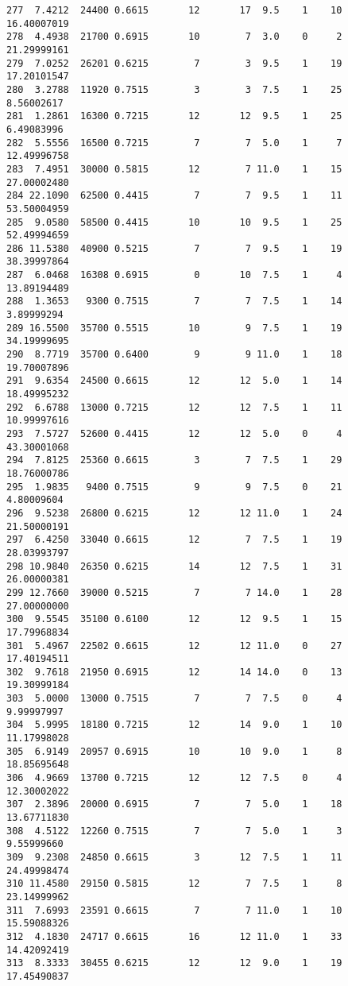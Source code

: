 \documentclass[
  letterpaper,
  DIV=11,
  numbers=noendperiod]{scrreprt}
\begin{document}
\begin{verbatim}
277  7.4212  24400 0.6615       12       17  9.5    1    10 16.40007019
278  4.4938  21700 0.6915       10        7  3.0    0     2 21.29999161
279  7.0252  26201 0.6215        7        3  9.5    1    19 17.20101547
280  3.2788  11920 0.7515        3        3  7.5    1    25  8.56002617
281  1.2861  16300 0.7215       12       12  9.5    1    25  6.49083996
282  5.5556  16500 0.7215        7        7  5.0    1     7 12.49996758
283  7.4951  30000 0.5815       12        7 11.0    1    15 27.00002480
284 22.1090  62500 0.4415        7        7  9.5    1    11 53.50004959
285  9.0580  58500 0.4415       10       10  9.5    1    25 52.49994659
286 11.5380  40900 0.5215        7        7  9.5    1    19 38.39997864
287  6.0468  16308 0.6915        0       10  7.5    1     4 13.89194489
288  1.3653   9300 0.7515        7        7  7.5    1    14  3.89999294
289 16.5500  35700 0.5515       10        9  7.5    1    19 34.19999695
290  8.7719  35700 0.6400        9        9 11.0    1    18 19.70007896
291  9.6354  24500 0.6615       12       12  5.0    1    14 18.49995232
292  6.6788  13000 0.7215       12       12  7.5    1    11 10.99997616
293  7.5727  52600 0.4415       12       12  5.0    0     4 43.30001068
294  7.8125  25360 0.6615        3        7  7.5    1    29 18.76000786
295  1.9835   9400 0.7515        9        9  7.5    0    21  4.80009604
296  9.5238  26800 0.6215       12       12 11.0    1    24 21.50000191
297  6.4250  33040 0.6615       12        7  7.5    1    19 28.03993797
298 10.9840  26350 0.6215       14       12  7.5    1    31 26.00000381
299 12.7660  39000 0.5215        7        7 14.0    1    28 27.00000000
300  9.5545  35100 0.6100       12       12  9.5    1    15 17.79968834
301  5.4967  22502 0.6615       12       12 11.0    0    27 17.40194511
302  9.7618  21950 0.6915       12       14 14.0    0    13 19.30999184
303  5.0000  13000 0.7515        7        7  7.5    0     4  9.99997997
304  5.9995  18180 0.7215       12       14  9.0    1    10 11.17998028
305  6.9149  20957 0.6915       10       10  9.0    1     8 18.85695648
306  4.9669  13700 0.7215       12       12  7.5    0     4 12.30002022
307  2.3896  20000 0.6915        7        7  5.0    1    18 13.67711830
308  4.5122  12260 0.7515        7        7  5.0    1     3  9.55999660
309  9.2308  24850 0.6615        3       12  7.5    1    11 24.49998474
310 11.4580  29150 0.5815       12        7  7.5    1     8 23.14999962
311  7.6993  23591 0.6615        7        7 11.0    1    10 15.59088326
312  4.1830  24717 0.6615       16       12 11.0    1    33 14.42092419
313  8.3333  30455 0.6215       12       12  9.0    1    19 17.45490837

\end{verbatim}
\end{document}
